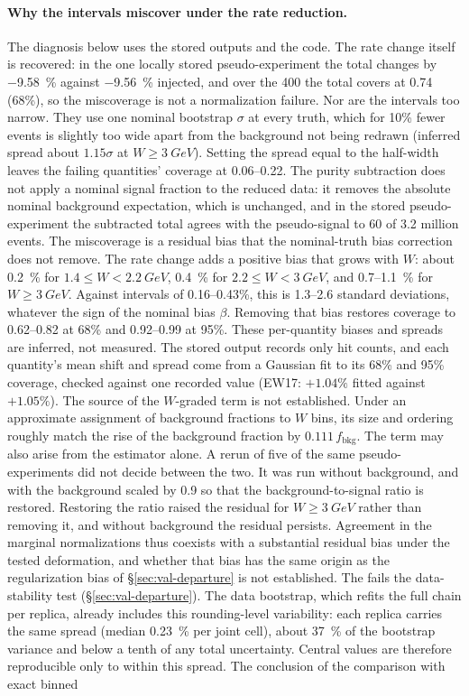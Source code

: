 \paragraph{Why the intervals miscover under the rate reduction.} The diagnosis below uses the stored outputs and the code.  The rate change itself is recovered: in the one locally stored pseudo-experiment the total changes by \SI{-9.58}{\percent} against \SI{-9.56}{\percent} injected, and over the 400 the total covers at 0.74 (68\%), so the miscoverage is not a normalization failure.  Nor are the intervals too narrow. They use one nominal bootstrap $\sigma$ at every truth, which for 10\% fewer events is slightly too wide apart from the background not being redrawn (inferred spread about $1.15\sigma$ at $W\ge\SI{3}{GeV}$). Setting the spread equal to the half-width leaves the failing quantities' coverage at 0.06--0.22.  The purity subtraction does not apply a nominal signal fraction to the reduced data: it removes the absolute nominal background expectation, which is unchanged, and in the stored pseudo-experiment the subtracted total agrees with the pseudo-signal to 60 of 3.2 million events. The miscoverage is a residual bias that the nominal-truth bias correction does not remove.  The rate change adds a positive bias that grows with $W$: about \SI{0.2}{\percent} for $1.4\le W<\SI{2.2}{GeV}$, \SI{0.4}{\percent} for $2.2\le W<\SI{3}{GeV}$, and 0.7--\SI{1.1}{\percent} for $W\ge\SI{3}{GeV}$. Against intervals of 0.16--0.43\%, this is 1.3--2.6 standard deviations, whatever the sign of the nominal bias $\beta$. Removing that bias restores coverage to 0.62--0.82 at 68\% and 0.92--0.99 at 95\%. These per-quantity biases and spreads are inferred, not measured. The stored output records only hit counts, and each quantity's mean shift and spread come from a Gaussian fit to its 68\% and 95\% coverage, checked against one recorded value (EW17: $+1.04\%$ fitted against $+1.05\%$).  The source of the $W$-graded term is not established. Under an approximate assignment of background fractions to $W$ bins, its size and ordering roughly match the rise of the background fraction by $0.111\,f_{\mathrm{bkg}}$. The term may also arise from the estimator alone. A rerun of five of the same pseudo-experiments did not decide between the two. It was run without background, and with the background scaled by 0.9 so that the background-to-signal ratio is restored. Restoring the ratio raised the residual for $W\ge\SI{3}{GeV}$ rather than removing it, and without background the residual persists. Agreement in the marginal normalizations thus coexists with a substantial residual bias under the tested deformation, and whether that bias has the same origin as the regularization bias of \S\ref{sec:val-departure} is not established. The \estMultiD{} fails the data-stability test (\S\ref{sec:val-departure}). The data bootstrap, which refits the full chain per replica, already includes this rounding-level variability: each replica carries the same spread (median \SI{0.23}{\percent} per joint cell), about \SI{37}{\percent} of the bootstrap variance and below a tenth of any total uncertainty. Central values are therefore reproducible only to within this spread. The conclusion of the comparison with exact binned 